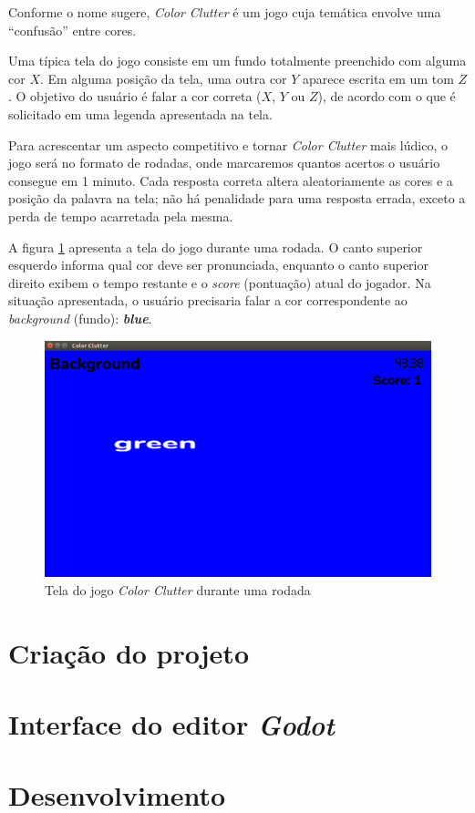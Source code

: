 Conforme o nome sugere, \textit{Color Clutter} é um jogo cuja temática envolve uma ``confusão'' entre cores.

Uma típica tela do jogo consiste em um fundo totalmente preenchido com alguma cor \(X\). Em alguma posição da tela, uma outra cor \(Y\) aparece escrita em um tom \(Z\). O objetivo do usuário é falar a cor correta (\(X\), \(Y\) ou \(Z\)), de acordo com o que é solicitado em uma legenda apresentada na tela.

Para acrescentar um aspecto competitivo e tornar \textit{Color Clutter} mais lúdico, o jogo será no formato de rodadas, onde marcaremos quantos acertos o usuário consegue em 1 minuto. Cada resposta correta altera aleatoriamente as cores e a posição da palavra na tela; não há penalidade para uma resposta errada, exceto a perda de tempo acarretada pela mesma.

A figura \ref{color-clutter-screen} apresenta a tela do jogo durante uma rodada. O canto superior esquerdo informa qual cor deve ser pronunciada, enquanto o canto superior direito exibem o tempo restante e o \textit{score} (pontuação) atual do jogador. Na situação apresentada, o usuário precisaria falar a cor correspondente ao \textit{background} (fundo): \textbf{\textit{blue}}.

\begin{figure}[H]
  \centering
  \includegraphics[width=.8\textwidth]{image/color-clutter-screen}
  \caption{Tela do jogo \textit{Color Clutter} durante uma rodada}
  \label{color-clutter-screen}
\end{figure}


\section{Criação do projeto}


\section{Interface do editor \textit{Godot}}


\section{Desenvolvimento}
